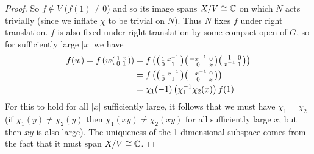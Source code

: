 \begin{proof}
    So $f \not\in V$ ($f(1) \neq 0$) and so its image spans $X/V \cong \mathbb{C}$ on which $N$ acts trivially (since we inflate $\chi$ to be trivial on $N$). Thus $N$ fixes $f$ under right translation. $f$ is also fixed under right translation by some compact open of $G$, so for sufficiently large $|x|$ we have
    \begin{equation*}
        \begin{split}
            f(w) = f\left(w \begin{psmallmatrix}
                1&x \\0 & 1
            \end{psmallmatrix}\right) &= f\left( \begin{psmallmatrix}
                1&x^{-1} \\0 & 1
            \end{psmallmatrix}\begin{psmallmatrix}
                -x^{-1}&0 \\0 & x
            \end{psmallmatrix}\begin{psmallmatrix}
                1&0 \\x^{-1} & 1
            \end{psmallmatrix}\right) \\
            &= f\left( \begin{psmallmatrix}
                1&x^{-1} \\0 & 1
            \end{psmallmatrix}\begin{psmallmatrix}
                -x^{-1}&0 \\0 & x
            \end{psmallmatrix}\right) \\
            &= \chi_1(-1) \left( \chi_1^{-1}\chi_2(x)\right) f(1)
        \end{split}
    \end{equation*}
    For this to hold for all $|x|$ sufficiently large, it follows that we must have $\chi_1=\chi_2$ (if $\chi_1(y) \neq \chi_2(y)$ then $\chi_1(xy) \neq \chi_2(xy)$ for all sufficiently large $x$, but then $xy$ is also large). The uniqueness of the 1-dimensional subspace comes from the fact that it must span $X/V \cong \mathbb{C}$. 
\end{proof}

